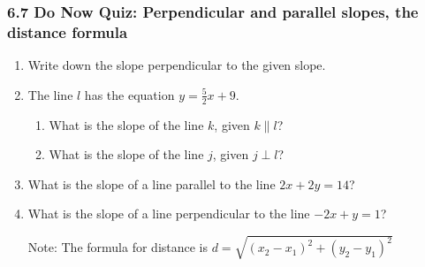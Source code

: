 \documentclass[12pt, twoside]{article}
\begin{document}
\subsubsection*{6.7 Do Now Quiz: Perpendicular and parallel slopes, the distance formula}
  \begin{enumerate}

  \item Write down the slope perpendicular to the given slope.
  \begin{enumerate}
  \end{enumerate} \vspace{1cm}

  
  \item The line $l$ has the equation $y=\frac{5}{2} x+9$.
  \begin{enumerate}
    \item What is the slope of the line $k$, given $k \parallel l$?
    \vspace{1.5cm}
    \item What is the slope of the line $j$, given $j \perp l$?
    \vspace{1.5cm}
  \end{enumerate}

  \item What is the slope of a line parallel to the line $2x+2y=14$?  \vspace{4cm}
  \item What is the slope of a line perpendicular to the line $-2x+y=1$?  
 
\newpage
    Note: The formula for distance is $\displaystyle d=\sqrt{(x_2-x_1)^2+(y_2-y_1)^2}$


\end{enumerate}
\end{document}
